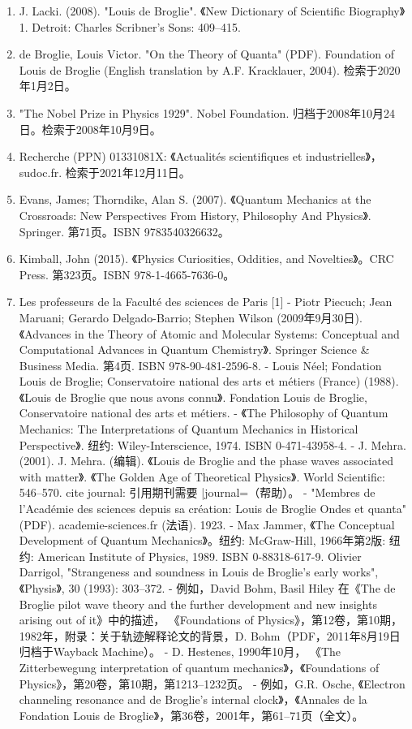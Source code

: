 \begin{enumerate}
\item J. Lacki. (2008). "Louis de Broglie". 《New Dictionary of Scientific Biography》 1. Detroit: Charles Scribner's Sons: 409–415.
\item de Broglie, Louis Victor. "On the Theory of Quanta" (PDF). Foundation of Louis de Broglie (English translation by A.F. Kracklauer, 2004). 检索于2020年1月2日。
\item "The Nobel Prize in Physics 1929". Nobel Foundation. 归档于2008年10月24日。检索于2008年10月9日。
\item Recherche (PPN) 01331081X: 《Actualités scientifiques et industrielles》，sudoc.fr. 检索于2021年12月11日。
\item Evans, James; Thorndike, Alan S. (2007). 《Quantum Mechanics at the Crossroads: New Perspectives From History, Philosophy And Physics》. Springer. 第71页。ISBN 9783540326632。
\item Kimball, John (2015). 《Physics Curiosities, Oddities, and Novelties》。CRC Press. 第323页。ISBN 978-1-4665-7636-0。
\item Les professeurs de la Faculté des sciences de Paris [1]
- Piotr Piecuch; Jean Maruani; Gerardo Delgado-Barrio; Stephen Wilson (2009年9月30日). 《Advances in the Theory of Atomic and Molecular Systems: Conceptual and Computational Advances in Quantum Chemistry》. Springer Science & Business Media. 第4页. ISBN 978-90-481-2596-8.
- Louis Néel; Fondation Louis de Broglie; Conservatoire national des arts et métiers (France) (1988). 《Louis de Broglie que nous avons connu》. Fondation Louis de Broglie, Conservatoire national des arts et métiers.
- 《The Philosophy of Quantum Mechanics: The Interpretations of Quantum Mechanics in Historical Perspective》. 纽约: Wiley-Interscience, 1974. ISBN 0-471-43958-4.
- J. Mehra. (2001). J. Mehra. (编辑). 《Louis de Broglie and the phase waves associated with matter》. 《The Golden Age of Theoretical Physics》. World Scientific: 546–570. {{cite journal}}: 引用期刊需要 |journal=（帮助）。
- "Membres de l'Académie des sciences depuis sa création: Louis de Broglie Ondes et quanta" (PDF). academie-sciences.fr (法语). 1923.
- Max Jammer, 《The Conceptual Development of Quantum Mechanics》。纽约: McGraw-Hill, 1966年第2版: 纽约: American Institute of Physics, 1989. ISBN 0-88318-617-9. Olivier Darrigol, "Strangeness and soundness in Louis de Broglie's early works", 《Physis》, 30 (1993): 303–372.
- 例如，David Bohm, Basil Hiley 在《The de Broglie pilot wave theory and the further development and new insights arising out of it》中的描述， 《Foundations of Physics》，第12卷，第10期，1982年，附录：关于轨迹解释论文的背景，D. Bohm（PDF，2011年8月19日归档于Wayback Machine）。
- D. Hestenes, 1990年10月， 《The Zitterbewegung interpretation of quantum mechanics》，《Foundations of Physics》，第20卷，第10期，第1213–1232页。
- 例如，G.R. Osche, 《Electron channeling resonance and de Broglie's internal clock》，《Annales de la Fondation Louis de Broglie》，第36卷，2001年，第61–71页（全文）。
\end{enumerate}